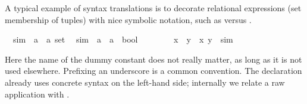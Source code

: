 \begin{isabellebody}
\begin{isamarkuptext}
  \medskip A typical example of syntax translations is to decorate
  relational expressions (set membership of tuples) with nice symbolic
  notation, such as  versus .%
\end{isamarkuptext}%
\isamarkuptrue%
\isanewline
\ \ sim\ {\isacharcolon}{\isacharcolon}\ {\isachardoublequote}{\isacharparenleft}{\isacharprime}a\ {\isasymtimes}\ {\isacharprime}a{\isacharparenright}\ set{\isachardoublequote}\isanewline
\isanewline
\isamarkupfalse%
\isanewline
\ \ {\isachardoublequote}{\isacharunderscore}sim{\isachardoublequote}\ {\isacharcolon}{\isacharcolon}\ {\isachardoublequote}{\isacharprime}a\ {\isasymRightarrow}\ {\isacharprime}a\ {\isasymRightarrow}\ bool{\isachardoublequote}\ \ \ \ {\isacharparenleft}\ {\isachardoublequote}{\isasymapprox}{\isachardoublequote}\ {}{}{\isacharparenright}\isanewline
\isamarkupfalse%
\isanewline
\ \ {\isachardoublequote}x\ {\isasymapprox}\ y{\isachardoublequote}\ {\isasymrightleftharpoons}\ {\isachardoublequote}{\isacharparenleft}x{\isacharcomma}\ y{\isacharparenright}\ {\isasymin}\ sim{\isachardoublequote}\isamarkupfalse%
%
\begin{isamarkuptext}%
\noindent Here the name of the dummy constant  does
  not really matter, as long as it is not used elsewhere.  Prefixing
  an underscore is a common convention.  The 
  declaration already uses concrete syntax on the left-hand side;
  internally we relate a raw application  with
  .


\end{isamarkuptext}
\end{isabellebody}

